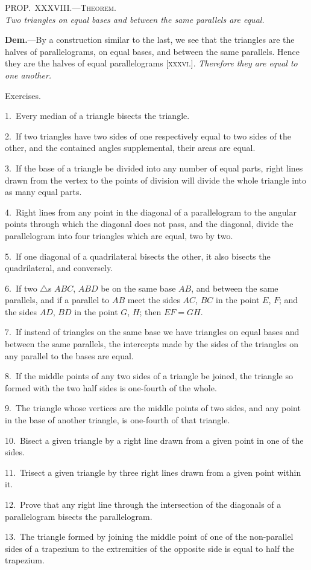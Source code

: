 \documentclass[oneside]{book}
\newcommand\myprop[2]{
\bigskip\Needspace*{4\baselineskip}\begin{center}\textsc{#1}\\\medskip\emph{#2}\par\end{center}
}
\newcommand\exhead[1]{
\Needspace*{5\baselineskip}\begin{center}
\textsf{#1}
\end{center}
}
\begin{document}
\myprop{PROP\@.~XXXVIII\@.---Theorem.}{Two triangles on equal bases and between the same
parallels are equal.}

\textbf{Dem.}---By a construction similar to the last, we see
that the triangles are the halves of parallelograms, on
equal bases, and between the same parallels. Hence
they are the halves of equal parallelograms [\textsc{xxxvi}.].
\emph{Therefore they are equal to one another.}

\exhead{Exercises.}

\begin{footnotesize}
1.~Every median of a triangle bisects the triangle.

2.~If two triangles have two sides of one respectively equal to
two sides of the other, and the contained angles supplemental,
their areas are equal.

3.~If the base of a triangle be divided into any number of equal
parts, right lines drawn from the vertex to the points of division
will divide the whole triangle into as many equal parts.

4.~Right lines from any point in the diagonal of a parallelogram
to the angular points through which the diagonal does not
pass, and the diagonal, divide the parallelogram into four triangles
which are equal, two by two.

5.~If one diagonal of a quadrilateral bisects the other, it also
bisects the quadrilateral, and conversely.

6.~If two $\triangle$s $ABC$, $ABD$ be on the same base $AB$, and between
the same parallels, and if a parallel to $AB$ meet the sides $AC$, $BC$
in the point $E$, $F$; and the sides $AD$, $BD$ in the point $G$, $H$; then
$EF = GH$.

7.~If instead of triangles on the same base we have triangles on
equal bases and between the same parallels, the intercepts made by
the sides of the triangles on any parallel to the bases are equal.

8.~If the middle points of any two sides of a triangle be joined,
the triangle so formed with the two half sides is one-fourth of the
whole.

9.~The triangle whose vertices are the middle points of two
sides, and any point in the base of another triangle, is one-fourth
of that triangle.

10.~Bisect a given triangle by a right line drawn from a given
point in one of the sides.

11.~Trisect a given triangle by three right lines drawn from a
given point within it.


12.~Prove that any right line through the intersection of the
diagonals of a parallelogram bisects the parallelogram\label{parallellogram}.

13.~The triangle formed by joining the middle point of one of
the non-parallel sides of a trapezium to the extremities of the
opposite side is equal to half the trapezium.
\par\end{footnotesize}
\end{document}
